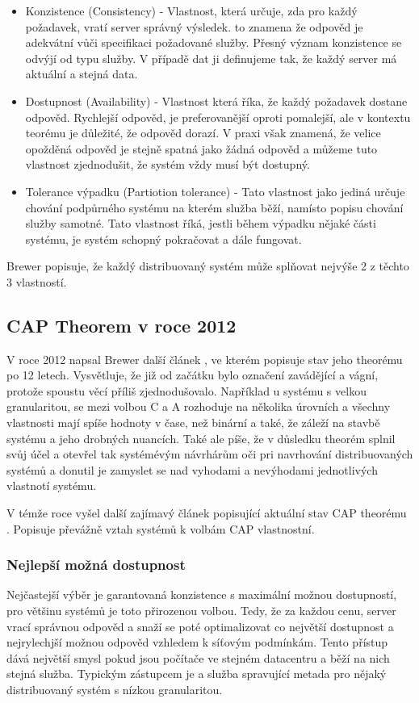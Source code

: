 \documentclass[thesis=M,czech]{FITthesis}[2012/06/26]
\begin{document}
\begin{itemize}
\item Konzistence (Consistency) - Vlastnost, která určuje, zda pro každý požadavek, vratí server správný výsledek. to znamena že odpověd je adekvátní vůči specifikaci požadované služby. Přesný význam konzistence se odvýjí od typu služby. V případě dat ji definujeme tak, že každý server má aktuální a stejná data.

\item Dostupnost (Availability) - Vlastnost která říka, že každý požadavek dostane odpověd. Rychlejší odpověd, je preferovanější oproti pomalejší, ale v kontextu teorému je důležité, že odpověd dorazí. V praxi však znamená, že velice opožděná odpověd je stejně spatná jako žádná odpověd a můžeme tuto vlastnost zjednodušit, že systém vždy musí být dostupný.

\item Tolerance výpadku (Partiotion tolerance) - Tato vlastnost jako jediná určuje chování podpůrného systému na kterém služba běží, namísto popisu chování služby samotné. Tato vlastnost říká, jestli během výpadku nějaké části systému, je systém schopný pokračovat a dále fungovat.

\end{itemize}


Brewer popisuje, že každý distribuovaný systém může splňovat nejvýše 2 z těchto 3 vlastností.

\subsection{CAP Theorem v roce 2012}
V roce 2012 napsal Brewer další článek \cite{cap2}, ve kterém popisuje stav jeho theorému po 12 letech. Vysvětluje, že již od začátku bylo označení  zavádějící a vágní, protože spoustu věcí příliš zjednodušovalo. Například u systému s velkou granularitou,  se mezi volbou C a A rozhoduje na několika úrovních a všechny vlastnosti mají spíše hodnoty v čase, než binární a také, že záleží na stavbě systému a jeho drobných nuancích. Také ale píše, že v důsledku theorém splnil svůj účel a otevřel tak systémévým návrhárům oči pri navrhování distribuovaných systémů a donutil je zamyslet se nad vyhodami a nevýhodami jednotlivých vlastnotí systému. 

V témže roce vyšel další zajímavý článek popisující aktuální stav CAP theorému \cite{cap3}. Popisuje převážně vztah
systémů k volbám CAP vlastnostní. 

\subsubsection{Nejlepší možná dostupnost}
Nejčastejší výběr je garantovaná konzistence s maximální možnou dostupností, pro většinu systémů je toto přirozenou volbou. Tedy, že za každou cenu, server vrací správnou odpověd a snaží se poté optimalizovat co největší dostupnost a nejrylechjší možnou odpověd vzhledem k síťovým podmínkám. Tento přístup dává největší smysl pokud jsou počítače ve stejném datacentru a běží na nich stejná služba. Typickým zástupcem je   a služba spravující metada pro nějaký distribuovaný systém s nízkou granularitou.
\end{document}
